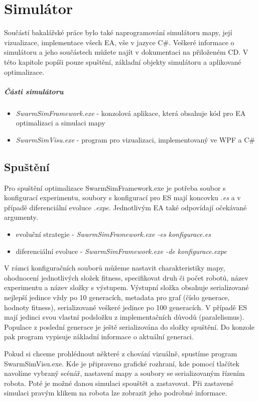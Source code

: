 
\chapter{Simulátor}
Součástí bakalářské práce bylo také naprogramování simulátoru mapy, její vizualizace, implementace všech EA, vše v jazyce C\#. Veškeré informace o simulátoru a jeho součástech můžete najít v dokumentaci na přiloženém CD. V této kapitole popíši pouze spuštění, základní objekty simulátoru a aplikované optimalizace. \par 
\paragraph{Části simulátoru}
\begin{itemize}
	\item \textit{SwarmSimFramework.exe} - konzolová aplikace, která obsahuje kód pro EA optimalizaci a simulaci mapy
	\item \textit{SwarmSimVisu.exe} - program pro vizualizaci, implementovaný ve WPF a C\# 
\end{itemize}

\section*{Spuštění}
Pro spuštění optimalizace SwarmSimFramework.exe je potřeba soubor s konfigurací experimentu, soubory s konfigurací pro ES mají koncovku \textit{.es} a v případě diferenciální evoluce \textit{.expe}. Jednotlivým EA také odpovídají očekávané argumenty. 
\begin{itemize}
	\item evoluční strategie - \textit{SwarmSimFramework.exe -es konfigurace.es}  
	\item diferenciální evoluce - \textit{SwarmSimFramework.exe -de konfigurace.expe} 
\end{itemize}
\par 
V rámci konfiguračních souborů můžeme nastavit charakteristiky mapy, ohodnocení jednotlivých složek fitness, specifikovat druh či počet robotů, název experimentu a název složky s výstupem. Výstupní složka obsahuje serializované nejlepší jedince vždy po 10 generacích, metadata pro graf (číslo generace, hodnoty fitness), serializované veškeré jedince po 100 generacích. V případě ES mají jedinci svou vlastní podsložku z implementačních důvodů (paralelismus). Populace z poslední generace je ještě serializována do složky spuštění. Do konzole pak program vypisuje základní informace o aktuální generaci.
\par 
Pokud si chceme prohlédnout některé z chování vizuálně, spustíme program SwarmSimVisu.exe. Kde je připraveno grafické rozhraní, kde pomocí tlačítek navolíme vybraný scénář, nastavení mapy a soubory se serializovaným řízením robota. Poté je možné danou simulaci spouštět a zastavovat. Při zastavené simulaci pravým klikem na robota lze zobrazit jeho podrobné informace.
\clearpage
